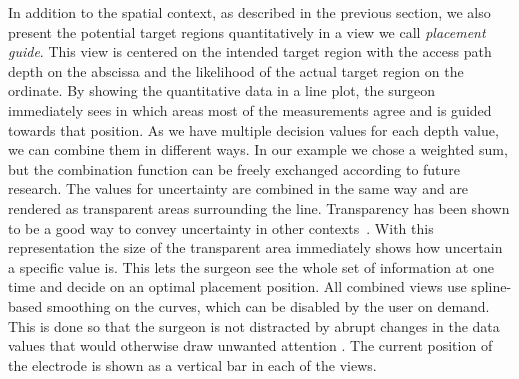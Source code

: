 \documentclass[review]{vgtc}                 %
\begin{document}
In addition to the spatial context, as described in the previous section, we also present the potential target regions quantitatively in a view we call \emph{placement guide}. This view is centered on the intended target region with the access path depth on the abscissa and the likelihood of the actual target region on the ordinate. By showing the quantitative data in a line plot, the surgeon immediately sees in which areas most of the measurements agree and is guided towards that position. As we have multiple decision values for each depth value, we can combine them in different ways. In our example we chose a weighted sum, but the combination function can be freely exchanged according to future research. The values for uncertainty are combined in the same way and are rendered as transparent areas surrounding the line. Transparency has been shown to be a good way to convey uncertainty in other contexts~\cite{Djurcilov2002239}. With this representation the size of the transparent area immediately shows how uncertain a specific value is. This lets the surgeon see the whole set of information at one time and decide on an optimal placement position. All combined views use spline-based smoothing on the curves, which can be disabled by the user on demand. This is done so that the surgeon is not distracted by abrupt changes in the data values that would otherwise draw unwanted attention . The current position of the electrode is shown as a vertical bar in each of the views.
\end{document}
